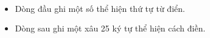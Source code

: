  
\begin{itemize}
	\item Dòng đầu ghi một số thể hiện thứ tự từ điển.
	\item Dòng sau ghi một xâu 25 ký tự thể hiện cách điền.
\end{itemize}
